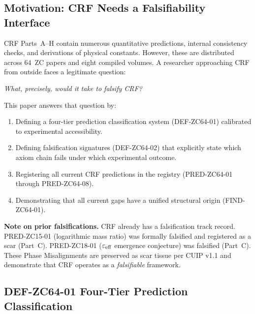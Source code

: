 \documentclass[12pt, a4paper]{article}
\begin{document}
\tableofcontents
\newpage

\subsection{Motivation: CRF Needs a Falsifiability Interface}
\label{sec:motivation}

\begin{keybox}[title={Why This Paper Now}]
CRF Parts~A--H contain numerous quantitative predictions,
internal consistency checks, and derivations of physical
constants. However, these are distributed across 64~ZC papers
and eight compiled volumes. A researcher approaching CRF
from outside faces a legitimate question:

\begin{center}
\textit{What, precisely, would it take to falsify CRF?}
\end{center}

This paper answers that question by:
\begin{enumerate}[leftmargin=2em, noitemsep]
  \item Defining a four-tier prediction classification system
    (DEF-ZC64-01) calibrated to experimental accessibility.
  \item Defining falsification signatures (DEF-ZC64-02) that
    explicitly state which axiom chain fails under which
    experimental outcome.
  \item Registering all current CRF predictions in the registry
    (PRED-ZC64-01 through PRED-ZC64-08).
  \item Demonstrating that all current gaps have a unified
    structural origin (FIND-ZC64-01).
\end{enumerate}

\textbf{Note on prior falsifications.}
CRF already has a falsification track record.
PRED-ZC15-01 (logarithmic mass ratio) was formally
falsified and registered as a scar (Part~C).
PRED-ZC18-01 ($\varepsilon_{\rm eff}$ emergence conjecture)
was falsified (Part~C).
These Phase Misalignments are preserved as scar tissue per
CUIP v1.1 and demonstrate that CRF operates as a
\emph{falsifiable} framework.
\end{keybox}

\subsection{DEF-ZC64-01 \quad Four-Tier Prediction Classification}
\label{sec:def01}
\end{document}

